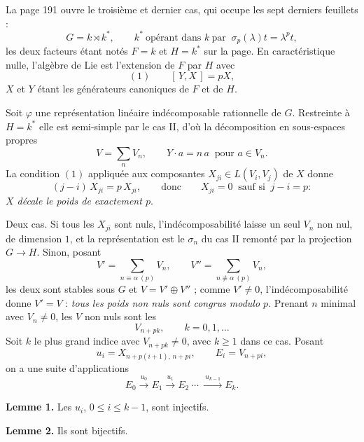 \documentclass[11pt,a4paper]{article}
\begin{document}
La page 191 ouvre le troisième et dernier cas, qui occupe les sept derniers
feuillets :
\[
G = k \rtimes k^{*} ,
\qquad k^{*} \ \text{opérant dans } k \ \text{par } \ \sigma_{p}(\lambda)t =
\lambda^{p}t ,
\]
les deux facteurs étant notés $F = k$ et $H = k^{*}$ sur la page. En
caractéristique nulle, l'algèbre de Lie est l'extension de $F$ par $H$ avec
\[
(1)\qquad [\,Y, X\,] = pX ,
\]
$X$ et $Y$ étant les générateurs canoniques de $F$ et de $H$.

Soit $\varphi$ une représentation linéaire indécomposable rationnelle de $G$.
Restreinte à $H = k^{*}$ elle est semi-simple par le cas II, d'où la
décomposition en sous-espaces propres
\[
V = \sum_{n} V_{n} ,
\qquad Y \cdot a = n\,a \ \text{ pour } a \in V_{n} .
\]
La condition $(1)$ appliquée aux composantes $X_{ji} \in L(V_{i}, V_{j})$ de
$X$ donne
\[
(j - i)\,X_{ji} = p\,X_{ji} ,
\qquad\text{donc}\qquad
X_{ji} = 0 \ \text{ sauf si } \ j - i = p :
\]
\emph{$X$ décale le poids de exactement $p$}.

Deux cas. Si tous les $X_{ji}$ sont nuls, l'indécomposabilité laisse un seul
$V_{n}$ non nul, de dimension $1$, et la représentation est le $\sigma_{n}$ du
cas II remonté par la projection $G \to H$. Sinon, posant
\[
V' = \sum_{n \equiv \alpha \ (p)} V_{n} ,
\qquad
V'' = \sum_{n \not\equiv \alpha \ (p)} V_{n} ,
\]
les deux sont stables sous $G$ et $V = V' \oplus V''$ ; comme $V' \neq 0$,
l'indécomposabilité donne $V' = V$ : \emph{tous les poids non nuls sont
congrus modulo $p$}. Prenant $n$ minimal avec $V_{n} \neq 0$, les $V$ non nuls
sont les
\[
V_{n+pk} , \qquad k = 0, 1, \ldots
\]
Soit $k$ le plus grand indice avec $V_{n+pk} \neq 0$, avec $k \geqslant 1$
dans ce cas. Posant
\[
u_{i} = X_{n+p(i+1),\,n+pi} , \qquad E_{i} = V_{n+pi} ,
\]
on a une suite d'applications
\[
E_{0} \xrightarrow{\ u_{0}\ } E_{1} \xrightarrow{\ u_{1}\ } E_{2}
\ \cdots\ \xrightarrow{\ u_{k-1}\ } E_{k} .
\]

\textbf{Lemme 1.} Les $u_{i}$, $0 \leqslant i \leqslant k-1$, sont injectifs.

\textbf{Lemme 2.} Ils sont bijectifs.
\end{document}
